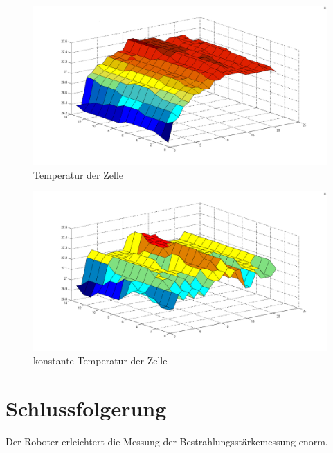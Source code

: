 \documentclass[a4paper,bibtotoc,oneside]{scrbook}
\begin{document}
\begin{figure}[htbp]
\centering
\includegraphics[width=150mm]{img/tempm1.png}
\caption[Temperatur der Zelle]{Temperatur der Zelle}\label{tm1}
\end{figure}

\begin{figure}[htbp]
\centering
\includegraphics[width=150mm]{img/tempm2.png}
\caption[konstante Temperatur der Zelle]{konstante Temperatur der Zelle}\label{tm2}
\end{figure}



\section{Schlussfolgerung}\thispagestyle{empty}

Der Roboter erleichtert die Messung der Bestrahlungsstärkemessung enorm.  




\end{document}
